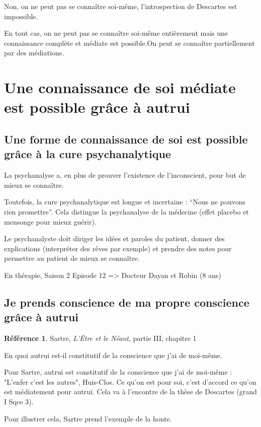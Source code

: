 \documentclass[french]{book}
\theoremstyle{definition}
\newtheorem*{refe}{Référence}
\begin{document}
Non, on ne peut pas se connaître soi-même, l’introspection de Descartes est impossible.


En tout cas, on ne peut pas se connaître soi-même entièrement mais une connaissance complète et médiate est possible.On peut se connaître partiellement par des médiations.

\section{Une connaissance de soi médiate est possible grâce à autrui}

\subsection{Une forme de connaissance de soi est possible grâce à la cure psychanalytique}

La psychanalyse a, en plus de prouver l’existence de l’inconscient, pour but de mieux se connaître.

Toutefois, la cure psychanalytique est longue et incertaine : “Nous ne pouvons rien promettre”. Cela distingue la psychanalyse de la médecine (effet placebo et mensonge pour mieux guérir).

Le psychanalyste doit diriger les idées et paroles du patient, donner des explications (interpréter des rêves par exemple) et prendre des notes pour permettre au patient de mieux se connaître.

En thérapie, Saison 2 Episode 12 
=> Docteur Dayan et Robin (8 ans)

\subsection{Je prends conscience de ma propre conscience grâce à autrui}

\begin{refe}
	Sartre, \textit{L'Être et le Néant}, partie III, chapitre 1
\end{refe}

En quoi autrui est-il constitutif de la conscience que j'ai de moi-même.

Pour Sartre, autrui est constitutif de la conscience que j'ai de moi-même : "L'enfer c'est les autres", Huis-Clos. Ce qu'on est pour soi, c'est d'accord ce qu'on est médiatement pour autrui. Cela va à l'encontre de la thèse de Descartes (grand I Sqce 3).

Pour illustrer cela, Sartre prend l’exemple de la honte.
\end{document}
